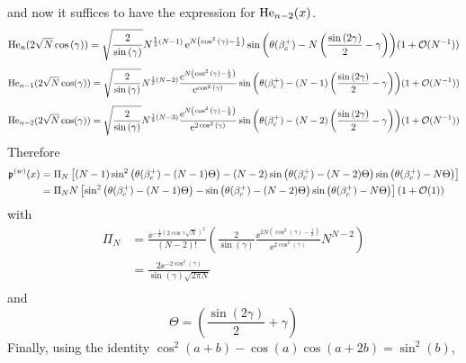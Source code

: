 and now it suffices to have the expression for $\mathrm{He}_{n-2}(x)$.
\begin{equation}
	\mathrm{He}_n(2\sqrt{N}\cos{(\gamma)}) = \sqrt{\frac{2}{\sin{(\gamma)}}}
	N^{\frac{1}{2} \left(N - 1\right)}
	\operatorname{e}^{N\left(\cos^2{(\gamma)} - \frac{1}{2} \right)} 
	\sin{
		\left(
		\theta(\beta_c^+) 
		-N\left(\frac{\sin{(2\gamma)}}{2}
		-\gamma\right)
		\right)
	} 
	(1 + \mathcal{O}(N^{-1}))
\end{equation}
\begin{equation}
	\mathrm{He}_{n-1}(2\sqrt{N}\cos(\gamma)) = \sqrt{\frac{2}{\sin{(\gamma)}}}
	N^{\frac{1}{2} \left(N -2\right)}
	\frac{\operatorname{e}^{N\left(\cos^2{(\gamma)} - \frac{1}{2} \right)}}{\operatorname{e}^{\cos^2{(\gamma)}}}
	\sin{
		\left(
		\theta(\beta_c^+) 
		-(N-1)\left(\frac{\sin{(2\gamma)}}{2}
		-\gamma\right)
		\right)
	} 
	(1 + \mathcal{O}(N^{-1}))
\end{equation}
\begin{equation}
	\mathrm{He}_{n-2}(2\sqrt{N}\cos(\gamma)) = \sqrt{\frac{2}{\sin{(\gamma)}}}
	N^{\frac{1}{2} \left(N - 3\right)}
	\frac{\operatorname{e}^{N\left(\cos^2{(\gamma)} - \frac{1}{2} \right)}}{\operatorname{e}^{2\cos^2{(\gamma)}}}
	\sin{
		\left(
		\theta(\beta_c^+) 
		-(N-2)\left(\frac{\sin{(2\gamma)}}{2}
		-\gamma\right)
		\right)
	} 
	(1 + \mathcal{O}(N^{-1}))
\end{equation}
Therefore
\begin{align}
		\mathfrak{p}^{(w)}(x) & =  \Pi_N \left[(N-1) \sin^2{\left(\theta(\beta_c^+)-(N-1)\Theta \right)} - (N-2) \sin{\left(\theta(\beta_c^+)-(N-2)\Theta\right)}  \sin{\left(\theta(\beta_c^+)-N\Theta \right)} \right] \\
		& =  \Pi_N N \left[\sin^2{\left(\theta(\beta_c^+)-(N-1)\Theta \right)} - \sin{\left(\theta(\beta_c^+)-(N-2)\Theta\right)}  \sin{\left(\theta(\beta_c^+)-N\Theta \right)} \right] \left(1 + \mathcal{O}(1) \right)
\end{align}
with
\begin{align}
	\Pi_N & = \frac{\ee^{-\frac{1}{2}\left(2\cos{\gamma}\sqrt{N}\right)^2}}{(N-2)!} \left( \frac{2}{\sin(\gamma)} 	\frac{\ee^{2N\left(\cos^2{(\gamma)} - \frac{1}{2} \right)}}{\ee^{2\cos^2{(\gamma)}}} N^{N-2}\right) \\
	& = \frac{2 \ee^{-2\cos^2{(\gamma)}}}{\sin(\gamma) \sqrt{2\pi N}} \\
\end{align} 
and
\begin{equation}
	\Theta = \left(\frac{\sin{(2\gamma)}}{2}+\gamma\right)
\end{equation}
Finally, using the identity $\cos^2(a + b) - \cos(a)\cos(a+2b) = \sin^2(b)$,
